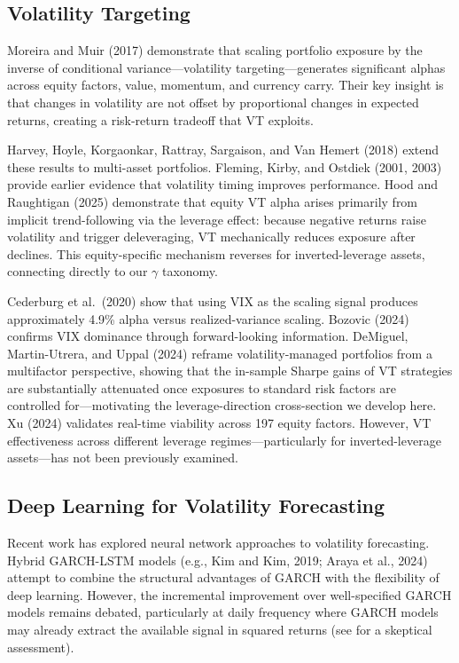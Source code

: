 \subsection{Volatility Targeting}

Moreira and Muir (2017) demonstrate that scaling portfolio exposure by the inverse of conditional variance---volatility targeting---generates significant alphas across equity factors, value, momentum, and currency carry. Their key insight is that changes in volatility are not offset by proportional changes in expected returns, creating a risk-return tradeoff that VT exploits.

Harvey, Hoyle, Korgaonkar, Rattray, Sargaison, and Van Hemert (2018) extend these results to multi-asset portfolios. Fleming, Kirby, and Ostdiek (2001, 2003) provide earlier evidence that volatility timing improves performance. Hood and Raughtigan (2025) demonstrate that equity VT alpha arises primarily from implicit trend-following via the leverage effect: because negative returns raise volatility and trigger deleveraging, VT mechanically reduces exposure after declines. This equity-specific mechanism reverses for inverted-leverage assets, connecting directly to our $\gamma$ taxonomy.

Cederburg et al.\ (2020) show that using VIX as the scaling signal produces approximately 4.9\% alpha versus realized-variance scaling. Bozovic (2024) confirms VIX dominance through forward-looking information. DeMiguel, Martin-Utrera, and Uppal (2024) reframe volatility-managed portfolios from a multifactor perspective, showing that the in-sample Sharpe gains of VT strategies are substantially attenuated once exposures to standard risk factors are controlled for---motivating the leverage-direction cross-section we develop here. Xu (2024) validates real-time viability across 197 equity factors. However, VT effectiveness across different leverage regimes---particularly for inverted-leverage assets---has not been previously examined.

\subsection{Deep Learning for Volatility Forecasting}

Recent work has explored neural network approaches to volatility forecasting. Hybrid GARCH-LSTM models (e.g., Kim and Kim, 2019; Araya et al., 2024) attempt to combine the structural advantages of GARCH with the flexibility of deep learning. However, the incremental improvement over well-specified GARCH models remains debated, particularly at daily frequency where GARCH models may already extract the available signal in squared returns (see \citealt{bucci2020} for a skeptical assessment).



